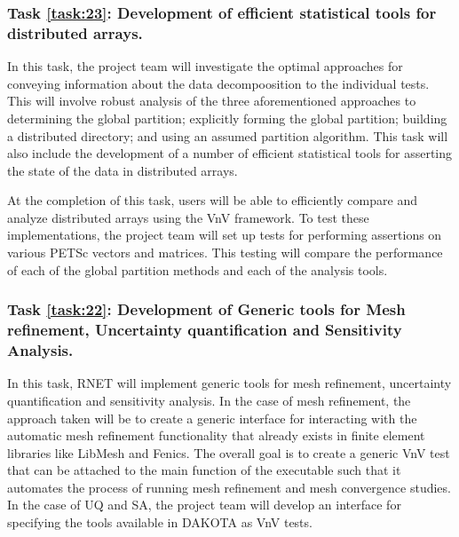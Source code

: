 \label{task:23}
\subsubsection{Task \ref{task:23}: Development of efficient statistical \VV tools for distributed arrays.}

In this task, the project team will investigate the optimal approaches for conveying information about the data decompoosition to the individual tests. This will involve robust analysis of the three aforementioned approaches to determining the global partition; explicitly forming the global partition; building a distributed directory; and using an assumed partition algorithm. This task will also include the development of a number of efficient statistical tools for asserting the state of the data in distributed arrays.

At the completion of this task, users will be able to efficiently compare and analyze distributed arrays using the VnV framework. To test these implementations, the project team will set up tests for performing assertions on various PETSc vectors and matrices. This testing will compare the performance of each of the global partition methods and each of the analysis tools. 


\label{task:22}
\subsubsection{Task \ref{task:22}: Development of Generic tools for Mesh refinement, Uncertainty quantification and Sensitivity Analysis.}
In this task, RNET will implement generic \VV tools for mesh refinement, uncertainty quantification and sensitivity analysis. In the case of mesh refinement, the approach taken will be to create a generic interface for interacting with the automatic mesh refinement functionality that already exists in finite element libraries like LibMesh and Fenics. The overall goal is to create a generic VnV test that can be attached to the main function of the executable such that it automates the process of running mesh refinement and mesh convergence studies. In the case of UQ and SA, the project team will develop an interface for specifying the tools available in DAKOTA as VnV tests. 



